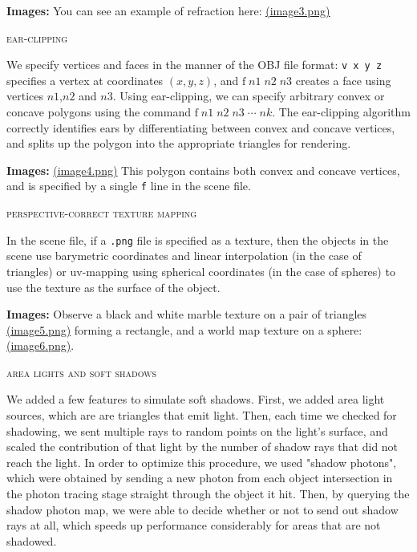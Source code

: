\documentclass{article}
\begin{document}
\vspace{3mm}
{\bf Images:} You can see an example of refraction here: \href{run://images/image3.png}{\underline{(image3.png)}}


\begin{center}\textsc{ear-clipping}\end{center} 
We specify vertices and faces in the manner of the OBJ file format: \verb+v x y z+ specifies a vertex at coordinates $(x,y,z)$, and $\mathrm{f}\; n1 \; n2 \; n3$ creates a face using vertices $n1$,$n2$ and $n3$. Using ear-clipping, we can specify arbitrary convex or concave polygons using the command $\mathrm{f }\; n1 \; n2 \; n3 \; \cdots \; nk$. The ear-clipping algorithm correctly identifies ears by differentiating between convex and concave vertices, and splits up the polygon into the appropriate triangles for rendering.

\vspace{3mm}
{\bf Images:} \href{run://images/image4.png}{\underline{(image4.png)}} This polygon contains both convex and concave vertices, and is specified by a single \verb+f+ line in the scene file.

\begin{center}\textsc{perspective-correct texture mapping}\end{center} 
In the scene file, if a \verb+.png+ file is specified as a texture, then the objects in the scene use barymetric coordinates and linear interpolation (in the case of triangles) or uv-mapping using spherical coordinates (in the case of spheres) to use the texture as the surface of the object.

\vspace{3mm}
{\bf Images:} Observe a black and white marble texture on a pair of triangles \href{run://images/image5.png}{\underline{(image5.png)}} forming a rectangle, and a world map texture on a sphere: \href{run://images/image6.png}{\underline{(image6.png)}}.

\begin{center}\textsc{area lights and soft shadows}\end{center} 
We added a few features to simulate soft shadows. First, we added area light sources, which are are triangles that emit light. Then, each time we checked for shadowing, we sent multiple rays to random points on the light's surface, and scaled the contribution of that light by the number of shadow rays that did not reach the light. In order to optimize this procedure, we used "shadow photons", which were obtained by sending a new photon from each object intersection in the photon tracing stage straight through the object it hit. Then, by querying the shadow photon map, we were able to decide whether or not to send out shadow rays at all, which speeds up performance considerably for areas that are not shadowed.
\end{document}
